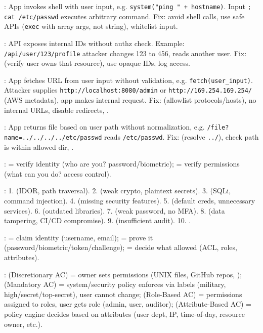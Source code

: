 : App invokes shell with user input, e.g. \texttt{system("ping " + hostname)}. Input \texttt{; cat /etc/passwd} executes arbitrary command. Fix: avoid shell calls, use safe APIs (\texttt{exec} with array args, not string), whitelist input.

: API exposes internal IDs without authz check. Example: \texttt{/api/user/123/profile} \to attacker changes 123 to 456, reads another user. Fix:  (verify user owns that resource), use opaque IDs, log access.

: App fetches URL from user input without validation, e.g. \texttt{fetch(user\_input)}. Attacker supplies \texttt{http://localhost:8080/admin} or \texttt{http://169.254.169.254/} (AWS metadata), app makes internal request. Fix:  (allowlist protocols/hosts), no internal URLs, disable redirects, .

: App returns file based on user path without normalization, e.g. \texttt{/file?name=../../../../etc/passwd} \to reads \texttt{/etc/passwd}. Fix:  (resolve \texttt{../}), check path is within allowed dir, .

:  = verify identity (who are you? password/biometric);  = verify permissions (what can you do? access control).

: 1.  (IDOR, path traversal). 2.  (weak crypto, plaintext secrets). 3.  (SQLi, command injection). 4.  (missing security features). 5.  (default creds, unnecessary services). 6.  (outdated libraries). 7.  (weak password, no MFA). 8.  (data tampering, CI/CD compromise). 9.  (insufficient audit). 10. .


:  = claim identity (username, email);  = prove it (password/biometric/token/challenge);  = decide what allowed (ACL, roles, attributes).

:  (Discretionary AC) = owner sets permissions (UNIX files, GitHub repos, );  (Mandatory AC) = system/security policy enforces via labels (military, high/secret/top-secret), user cannot change;  (Role-Based AC) = permissions assigned to roles, user gets role (admin, user, auditor);  (Attribute-Based AC) = policy engine decides based on attributes (user dept, IP, time-of-day, resource owner, etc.).

